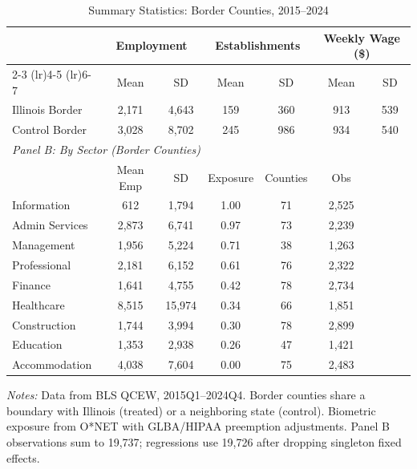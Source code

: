 \begin{table}[htbp]
\centering
\caption{Summary Statistics: Border Counties, 2015--2024}
\label{tab:summary}
\begin{tabular}{lcccccc}
\toprule
 & \multicolumn{2}{c}{Employment} & \multicolumn{2}{c}{Establishments} & \multicolumn{2}{c}{Weekly Wage (\$)} \\
\cmidrule(lr){2-3} \cmidrule(lr){4-5} \cmidrule(lr){6-7}
 & Mean & SD & Mean & SD & Mean & SD \\
\midrule
Illinois Border & 2,171 & 4,643 & 159 & 360 & 913 & 539 \\
Control Border & 3,028 & 8,702 & 245 & 986 & 934 & 540 \\
\midrule
\multicolumn{7}{l}{\textit{Panel B: By Sector (Border Counties)}} \\
\midrule
 & Mean Emp & SD & Exposure & Counties & Obs \\
\midrule
Information & 612 & 1,794 & 1.00 & 71 & 2,525 \\
Admin Services & 2,873 & 6,741 & 0.97 & 73 & 2,239 \\
Management & 1,956 & 5,224 & 0.71 & 38 & 1,263 \\
Professional & 2,181 & 6,152 & 0.61 & 76 & 2,322 \\
Finance & 1,641 & 4,755 & 0.42 & 78 & 2,734 \\
Healthcare & 8,515 & 15,974 & 0.34 & 66 & 1,851 \\
Construction & 1,744 & 3,994 & 0.30 & 78 & 2,899 \\
Education & 1,353 & 2,938 & 0.26 & 47 & 1,421 \\
Accommodation & 4,038 & 7,604 & 0.00 & 75 & 2,483 \\
\bottomrule
\end{tabular}
\begin{tablenotes}[flushleft]
\small
\item \textit{Notes:} Data from BLS QCEW, 2015Q1--2024Q4. Border counties share a boundary with Illinois (treated) or a neighboring state (control). Biometric exposure from O*NET with GLBA/HIPAA preemption adjustments. Panel B observations sum to 19,737; regressions use 19,726 after dropping singleton fixed effects.
\end{tablenotes}
\end{table}
